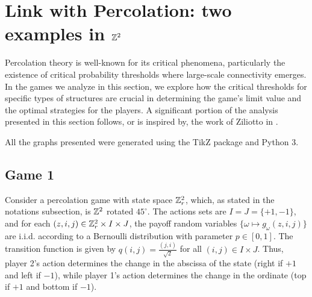 \section{Link with Percolation: two examples in $\mathbb{Z}^2$}


    Percolation theory is well-known for its critical phenomena, particularly the existence of critical probability thresholds where large-scale connectivity emerges. In the games we analyze in this section, we explore how the critical thresholds for specific types of structures are crucial in determining the game's limit value and the optimal strategies for the players. A significant portion of the analysis presented in this section follows, or is inspired by, the work of Ziliotto in \cite{Ziliotto2023}.

    All the graphs presented were generated using the TikZ package and Python 3.


	\subsection{Game 1} 
    	Consider a percolation game with state space $\mathbb{Z}_r^2$, which, as stated in the notations subsection, is $\mathbb{Z}^2$ rotated $45^\circ$. The actions sets are $I = J = \{+1, -1\}$, and for each $(z, i, j) \in \mathbb{Z}_r^2 \times I \times J$, the payoff random variables $\{\omega \mapsto g_{\omega}(z, i, j)\}$ are i.i.d. according to a Bernoulli distribution with parameter $p \in [0, 1]$. The transition function is given by $q(i, j) = \frac{(j, i)}{\sqrt{2}}$ for all $(i, j) \in I \times J$. Thus, player 2's action determines the change in the abscissa of the state (right if $+1$ and left if $-1$), while player 1's action determines the change in the ordinate (top if $+1$ and bottom if $-1$). 

